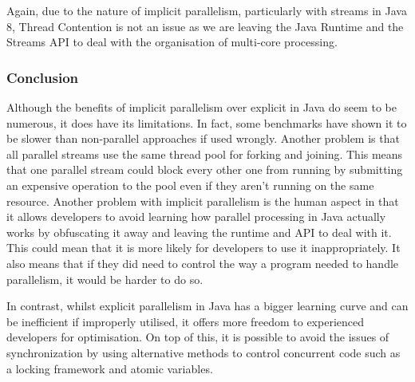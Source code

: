 \documentclass[]{report}
\begin{document}
Again, due to the nature of implicit parallelism, particularly with streams in Java 8, Thread Contention is not an issue as we are leaving the Java Runtime and the Streams API to deal with the organisation of multi-core processing.


\subsubsection{Conclusion}
Although the benefits of implicit parallelism over explicit in Java do seem to be numerous, it does have its limitations. In fact, some benchmarks have shown it to be slower than non-parallel approaches if used wrongly.\cite{Stream API} Another problem is that all parallel streams use the same thread pool for forking and joining\cite{Common Thread Pool}. This means that one parallel stream could block every other one from running by submitting an expensive operation to the pool even if they aren't running on the same resource. Another problem with implicit parallelism is the human aspect in that it allows developers to avoid learning how parallel processing in Java actually works by obfuscating it away and leaving the runtime and API to deal with it. This could mean that it is more likely for developers to use it inappropriately. It also means that if they did need to control the way a program needed to handle parallelism, it would be harder to do so. 

In contrast, whilst explicit parallelism in Java has a bigger learning curve and can be inefficient if improperly utilised, it offers more freedom to experienced developers for optimisation. On top of this, it is possible to avoid the issues of synchronization by using alternative methods to control concurrent code such as a locking framework and atomic variables.
\end{document}

